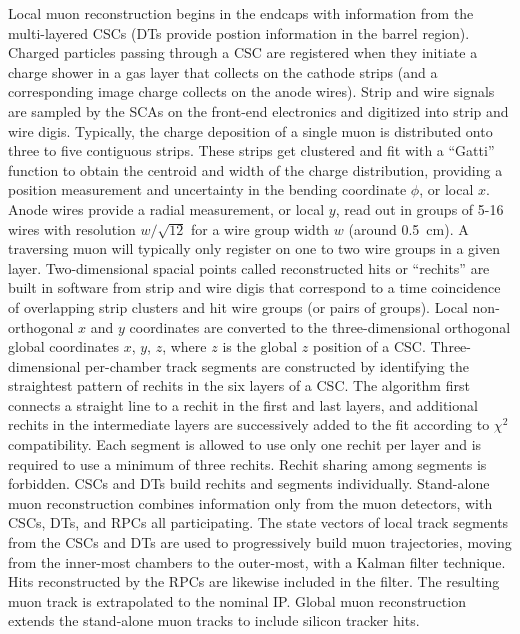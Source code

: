 
Local muon reconstruction begins in the endcaps with information from the multi-layered CSCs (DTs provide postion information in the barrel region). Charged particles passing through a CSC are registered when they initiate a charge shower in a gas layer that collects on the cathode strips (and a corresponding image charge collects on the anode wires). Strip and wire signals are sampled by the SCAs on the front-end electronics and digitized into strip and wire digis. Typically, the charge deposition of a single muon is distributed onto three to five contiguous strips. These strips get clustered and fit with a ``Gatti'' function to obtain the centroid and width of the charge distribution, providing a position measurement and uncertainty in the bending coordinate $\phi$, or local $x$. Anode wires provide a radial measurement, or local $y$, read out in groups of 5-16 wires with resolution $w/\sqrt{12}$ for a wire group width $w$ (around \SI{0.5}{cm}). A traversing muon will typically only register on one to two wire groups in a given layer. Two-dimensional spacial points called reconstructed hits or ``rechits'' are built in software from strip and wire digis that correspond to a time coincidence of overlapping strip clusters and hit wire groups (or pairs of groups). Local non-orthogonal $x$ and $y$ coordinates are converted to the three-dimensional orthogonal global coordinates $x$, $y$, $z$, where $z$ is the global $z$ position of a CSC. Three-dimensional per-chamber track segments are constructed by identifying the straightest pattern of rechits in the six layers of a CSC. The algorithm first connects a straight line to a rechit in the first and last layers, and additional rechits in the intermediate layers are successively added to the fit according to $\chi^2$ compatibility. Each segment is allowed to use only one rechit per layer and is required to use a minimum of three rechits. Rechit sharing among segments is forbidden. CSCs and DTs build rechits and segments individually. Stand-alone muon reconstruction combines information only from the muon detectors, with CSCs, DTs, and RPCs all participating. The state vectors of local track segments from the CSCs and DTs are used to progressively build muon trajectories, moving from the inner-most chambers to the outer-most, with a Kalman filter technique. Hits reconstructed by the RPCs are likewise included in the filter. The resulting muon track is extrapolated to the nominal IP. Global muon reconstruction extends the stand-alone muon tracks to include silicon tracker hits. 


